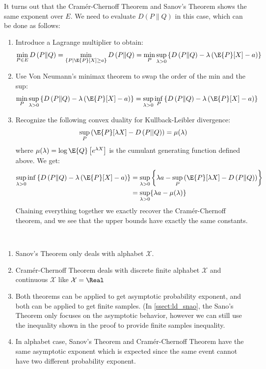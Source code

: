 \documentclass{article}
\begin{document}
It turns out that the Cramér-Chernoff Theorem and Sanov's Theorem shows the same exponent over $E$. 
We need to evaluate $D\left(P \| Q\right)$ in this case, which can be done as follows:
\begin{enumerate}
    \item Introduce a Lagrange multiplier to obtain:
$$
\min _{P \in E} D\left(P \| Q\right)=\min _{\left\{P \mid \E{P}[X] \geq a\right\}} D\left(P \| Q\right)=\min _{P} \sup _{\lambda>0}\left\{D\left(P \| Q\right)-\lambda\left(\E{P}[X]-a\right)\right\}
$$
\item Use Von Neumann's minimax theorem to swap the order of the min and the sup:
$$
\min _{P} \sup _{\lambda>0}\left\{D\left(P \| Q\right)-\lambda\left(\E{P}[X]-a\right)\right\}=\sup _{\lambda>0} \inf _{P}\left\{D\left(P \| Q\right)-\lambda\left(\E{P}[X]-a\right)\right\}
$$
\item Recognize the following convex duality for Kullback-Leibler divergence:
$$
\sup _{P}\left(\E{P}[\lambda X]-D\left(P|| Q\right)\right)=\mu(\lambda)
$$
where $\mu(\lambda)=\log \E{Q}\left[e^{\lambda X}\right]$ is the cumulant generating function defined above. We get:
$$
\begin{aligned}
\sup _{\lambda>0} \inf \left\{D\left(P \| Q\right)-\lambda\left(\E{P}[X]-a\right)\right\} &=\sup _{\lambda>0}\left\{\lambda a-\sup _{P}\left(\E{P}[\lambda X]-D\left(P \| Q\right)\right)\right\} \\
&=\sup _{\lambda>0}\{\lambda a-\mu(\lambda)\}
\end{aligned}
$$
Chaining everything together we exactly recover the Cramér-Chernoff theorem, and we see that the upper bounds have exactly the same constants.
\end{enumerate}

\\
\begin{enumerate}
    \item Sanov's Theorem only deals with  alphabet $\mathcal{X}$.
    \item  Cram\'{e}r-Chernoff Theorem deals with discrete finite alphabet $\mathcal{X}$ and continuous $\mathcal{X}$ like  $\mathcal{X}=\Real$
    \item Both theorems can be applied to get asymptotic probability exponent, and both can be applied to get finite samples. (In \cref{ssect:ld_snao}, the Sano's Theorem only focuses on the asymptotic behavior, however we can still use the inequality shown in the proof to provide finite samples inequality.
    \item In  alphabet case, Sanov's Theorem and  Cram\'{e}r-Chernoff Theorem have the same asymptotic exponent which is expected since the same event cannot have two different probability exponent.
\end{enumerate}
\end{document}
